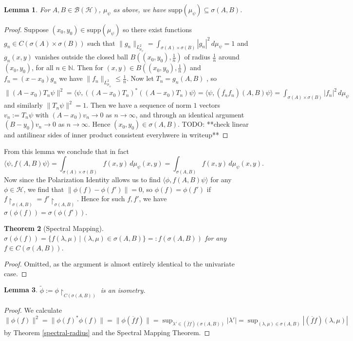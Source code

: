 \documentclass[12pt,oneside]{report}
\newtheorem{thm}{Theorem}[chapter]
\newtheorem{lem}[thm]{Lemma}
\begin{document}
 \begin{lem}
     For $A,B \in \mathscr{B}(\mathscr{H})$, $\mu_{\psi}$ as above, we have $\text{supp}(\mu_{\psi}) \subseteq \sigma(A,B)$.
 \end{lem}
\begin{proof}
    Suppose $(x_{0},y_{0}) \in \text{supp}(\mu_{\psi})$ so there exist functions $g_{n} \in C(\sigma(A) \times \sigma(B))$ such that $\|g_{n}\|_{L_{\mu_{\psi}}^{2}} = \int _{\sigma(A) \times \sigma(B)} |g_{n}|^{2} \, d\mu_{\psi} = 1$ and $g_{n}(x,y)$ vanishes outside the closed ball $B\left( (x_{0},y_{0}), \frac{1}{n} \right)$ of radius $\frac{1}{n}$ around $(x_{0},y_{0})$, for all $n \in \mathbb{N}$. Then for $(x,y) \in B\left( (x_{0},y_{0}), \frac{1}{n} \right)$ and $f_{n} = (x-x_{0})g_{n}$ we have $\|f_{n}\|_{L_{\mu_{\psi}}^{2}} \leq \frac{1}{n}$. Now let $T_{n} = g_{n}(A,B)$ , so $\|(A - x_{0})T_{n}\psi\|^{2} = \langle \psi, ((A - x_{0})T_{n})^{*}((A - x_{0})T_{n})\psi \rangle = \langle \psi,(\overline{f_{n}}f_{n})(A,B)\psi \rangle = \int _{\sigma(A) \times \sigma(B)} |f_{n}|^{2} \, d\mu_{\psi}$ and similarly $\|T_{n}\psi\|^{2} = 1$. Then we have a sequence of norm $1$ vectors $v_{n} := T_{n}\psi$ with $(A - x_{0})v_{n} \to 0$ as $n \to \infty$, and through an identical argument $(B - y_{0})v_{n} \to 0$ as $n \to \infty$. Hence $(x_{0},y_{0}) \in \sigma(A,B)$. TODO: **check linear and antilinear sides of inner product consistent everyhwere in writeup**
\end{proof}

From this lemma we conclude that in fact
$$\langle \psi, f(A,B)\psi \rangle = \int _{\sigma(A) \times \sigma(B)} f(x,y) \, d\mu_{\psi}(x,y) = \int _{\sigma(A,B)} f(x,y) \, d\mu_{\psi}(x,y).$$
Now since the Polarization Identity allows us to find $\langle \phi, f(A,B)\psi \rangle$ for any $\phi \in \mathscr{H}$, we find that $\|\phi(f) - \phi(f')\| = 0$, so $\phi(f) = \phi(f')$ if $f\restriction_{\sigma(A,B)} = f'\restriction_{\sigma(A,B)}$. Hence for such $f,f'$, we have $\sigma(\phi(f)) = \sigma(\phi(f'))$.

\begin{thm}[Spectral Mapping]
    $\sigma(\phi(f)) = \{ f(\lambda,\mu)  \, | \, (\lambda,\mu) \in \sigma(A,B) \} =: f(\sigma(A,B))$ for any $f \in C(\sigma(A,B))$.
\end{thm}
\begin{proof}
    Omitted, as the argument is almost entirely identical to the univariate case.
\end{proof}

\begin{lem}
    $\tilde{\phi} := \phi \restriction_{C(\sigma(A,B))}$ is an isometry.
\end{lem}
\begin{proof}
    We calculate $\|\phi(f)\|^{2} = \|\phi(f)^{*}\phi(f)\| = \|\phi(\overline{f}f)\| = \sup_{\lambda' \in (\overline{f}f)(\sigma(A,B))} |\lambda'| = \sup_{(\lambda,\mu) \in \sigma(A,B)} |(\overline{f}f)(\lambda,\mu)|$ by Theorem \ref{spectral-radius} and the Spectral Mapping Theorem.
\end{proof}
\end{document}
